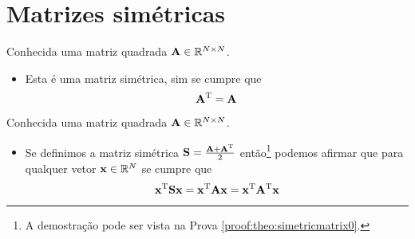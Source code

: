 \section{ Matrizes simétricas}


\begin{definition}\label{def:symmetricmatrix0}
Conhecida uma matriz quadrada $\MATRIX{A} \in \mathbb{R}^{N \times N}$. 
\begin{itemize}
\item Esta é uma matriz simétrica, sim se cumpre que \cite[pp. 18]{golub2013matrix} 
\begin{equation}
\MATRIX{A}^{\transpose} = \MATRIX{A}
\end{equation}
\end{itemize}
\end{definition}

\begin{theorem}\label{theo:simetricmatrix0}
Conhecida uma matriz quadrada $\MATRIX{A} \in \mathbb{R}^{N \times N}$.
\begin{itemize}
\item Se definimos a matriz simétrica $\MATRIX{S}=\frac{\MATRIX{A}+\MATRIX{A}^{\transpose}}{2}$ então\footnote{A
demostração pode ser vista na Prova \ref{proof:theo:simetricmatrix0}.} 
podemos afirmar que para qualquer vetor $\VECTOR{x} \in \mathbb{R}^{N}$ se cumpre que 
\begin{equation}
\VECTOR{x}^{\transpose}\MATRIX{S}\VECTOR{x} = 
\VECTOR{x}^{\transpose}\MATRIX{A}\VECTOR{x} =
\VECTOR{x}^{\transpose}\MATRIX{A}^{\transpose}\VECTOR{x}
\end{equation}
\end{itemize}
\end{theorem}


